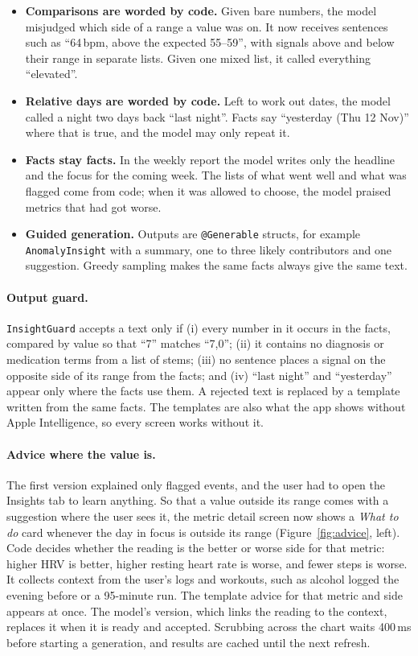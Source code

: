 \documentclass[11pt,a4paper]{article}
\begin{document}
\begin{itemize}
  \item \textbf{Comparisons are worded by code.} Given bare numbers, the model misjudged which side of a range a value was on. It now receives sentences such as ``64\,bpm, above the expected 55--59'', with signals above and below their range in separate lists. Given one mixed list, it called everything ``elevated''.
  \item \textbf{Relative days are worded by code.} Left to work out dates, the model called a night two days back ``last night''. Facts say ``yesterday (Thu 12 Nov)'' where that is true, and the model may only repeat it.
  \item \textbf{Facts stay facts.} In the weekly report the model writes only the headline and the focus for the coming week. The lists of what went well and what was flagged come from code; when it was allowed to choose, the model praised metrics that had got worse.
  \item \textbf{Guided generation.} Outputs are \texttt{@Generable} structs, for example \texttt{AnomalyInsight} with a summary, one to three likely contributors and one suggestion. Greedy sampling makes the same facts always give the same text.
\end{itemize}

\paragraph{Output guard.} \texttt{InsightGuard} accepts a text only if (i) every number in it occurs in the facts, compared by value so that ``7'' matches ``7,0''; (ii) it contains no diagnosis or medication terms from a list of stems; (iii) no sentence places a signal on the opposite side of its range from the facts; and (iv) ``last night'' and ``yesterday'' appear only where the facts use them. A rejected text is replaced by a template written from the same facts. The templates are also what the app shows without Apple Intelligence, so every screen works without it.

\paragraph{Advice where the value is.} The first version explained only flagged events, and the user had to open the Insights tab to learn anything. So that a value outside its range comes with a suggestion where the user sees it, the metric detail screen now shows a \emph{What to do} card whenever the day in focus is outside its range (Figure~\ref{fig:advice}, left). Code decides whether the reading is the better or worse side for that metric: higher HRV is better, higher resting heart rate is worse, and fewer steps is worse. It collects context from the user's logs and workouts, such as alcohol logged the evening before or a 95-minute run. The template advice for that metric and side appears at once. The model's version, which links the reading to the context, replaces it when it is ready and accepted. Scrubbing across the chart waits 400\,ms before starting a generation, and results are cached until the next refresh.
\end{document}
